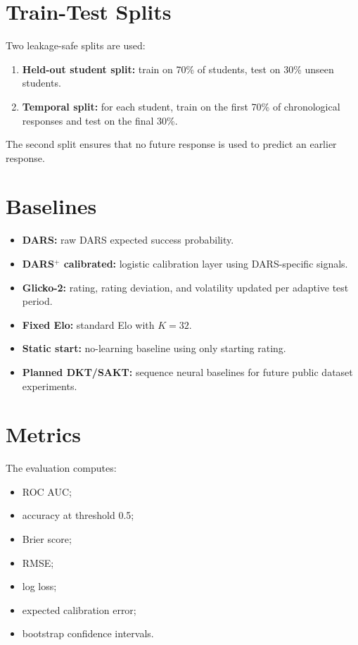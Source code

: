 \documentclass[12pt,a4paper]{report}
\begin{document}
\section{Train-Test Splits}
Two leakage-safe splits are used:

\begin{enumerate}[leftmargin=*]
  \item \textbf{Held-out student split:} train on 70\% of students, test on 30\% unseen students.
  \item \textbf{Temporal split:} for each student, train on the first 70\% of chronological responses and test on the final 30\%.
\end{enumerate}

The second split ensures that no future response is used to predict an earlier response.

\section{Baselines}
\begin{itemize}[leftmargin=*]
  \item \textbf{DARS:} raw DARS expected success probability.
  \item \textbf{DARS$^+$ calibrated:} logistic calibration layer using DARS-specific signals.
  \item \textbf{Glicko-2:} rating, rating deviation, and volatility updated per adaptive test period.
  \item \textbf{Fixed Elo:} standard Elo with $K=32$.
  \item \textbf{Static start:} no-learning baseline using only starting rating.
  \item \textbf{Planned DKT/SAKT:} sequence neural baselines for future public dataset experiments.
\end{itemize}

\section{Metrics}
The evaluation computes:

\begin{itemize}[leftmargin=*]
  \item ROC AUC;
  \item accuracy at threshold 0.5;
  \item Brier score;
  \item RMSE;
  \item log loss;
  \item expected calibration error;
  \item bootstrap confidence intervals.
\end{itemize}
\end{document}
